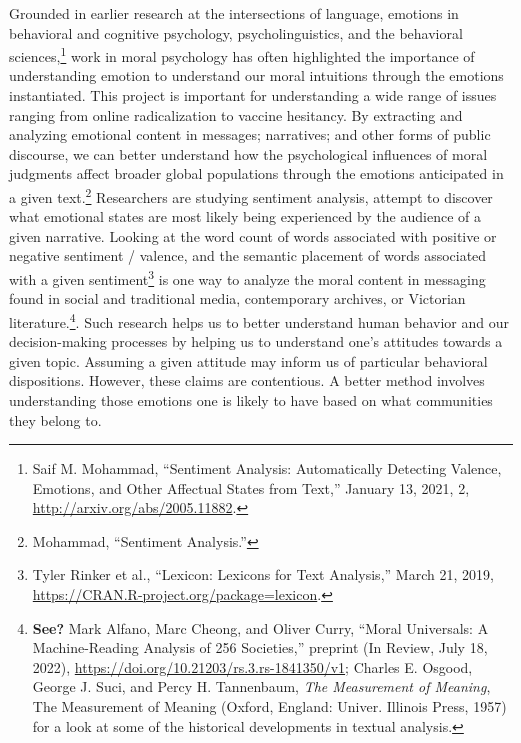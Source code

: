 \documentclass[phdthesis,12pt,final]{wuthesis}
\theoremstyle{definition}
\theoremstyle{definition}
\theoremstyle{definition}
\theoremstyle{definition}
\theoremstyle{remark}
\begin{document}
Grounded in earlier research at the intersections of language, emotions in behavioral and cognitive psychology, psycholinguistics, and the behavioral sciences,\footnote{Saif M. Mohammad, {``Sentiment {Analysis}: {Automatically Detecting Valence}, {Emotions}, and {Other Affectual States} from {Text},''} January 13, 2021, 2, \url{http://arxiv.org/abs/2005.11882}.} work in moral psychology has often highlighted the importance of understanding emotion to understand our moral intuitions through the emotions instantiated. This project is important for understanding a wide range of issues ranging from online radicalization to vaccine hesitancy. By extracting and analyzing emotional content in messages; narratives; and other forms of public discourse, we can better understand how the psychological influences of moral judgments affect broader global populations through the emotions anticipated in a given text.\footnote{Mohammad, {``Sentiment {Analysis}.''}} Researchers are studying sentiment analysis, attempt to discover what emotional states are most likely being experienced by the audience of a given narrative. Looking at the word count of words associated with positive or negative sentiment / valence, and the semantic placement of words associated with a given sentiment\footnote{Tyler Rinker et al., {``Lexicon: {Lexicons} for {Text Analysis},''} March 21, 2019, \url{https://CRAN.R-project.org/package=lexicon}.} is one way to analyze the moral content in messaging found in social and traditional media, contemporary archives, or Victorian literature.\footnote{\textbf{See?} Mark Alfano, Marc Cheong, and Oliver Curry, {``Moral {Universals}: {A} Machine-Reading Analysis of 256 Societies,''} preprint (In Review, July 18, 2022), \url{https://doi.org/10.21203/rs.3.rs-1841350/v1}; Charles E. Osgood, George J. Suci, and Percy H. Tannenbaum, \emph{The Measurement of Meaning}, The Measurement of Meaning (Oxford, England: Univer. Illinois Press, 1957) for a look at some of the historical developments in textual analysis.}. Such research helps us to better understand human behavior and our decision-making processes by helping us to understand one's attitudes towards a given topic. Assuming a given attitude may inform us of particular behavioral dispositions. However, these claims are contentious. A better method involves understanding those emotions one is likely to have based on what communities they belong to.
\end{document}
